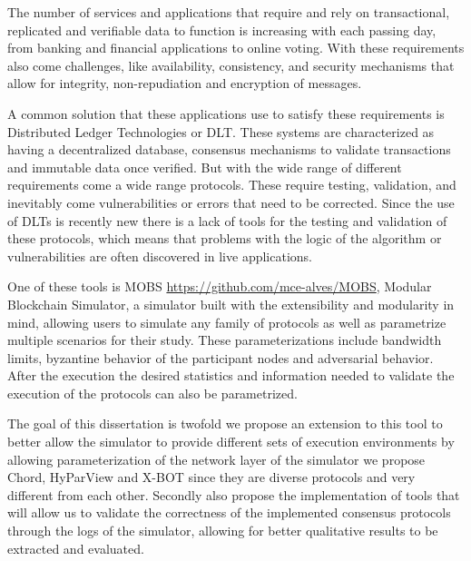 
%

The number of services and applications that require and rely on transactional, replicated and verifiable data to 
function is increasing with each passing day, from banking and financial applications to online voting. With these
requirements also come challenges, like availability, consistency, and security mechanisms that allow for integrity, non-repudiation and
encryption of messages.

A common solution that these applications use to satisfy these requirements is Distributed Ledger Technologies 
or DLT. These systems are characterized as having a decentralized database, consensus mechanisms 
to validate transactions and immutable data once verified. But with the wide range of different requirements come a wide range protocols.
These require testing, validation, and inevitably come vulnerabilities or errors that need to be corrected.
Since the use of DLTs is recently new there is a lack of tools for the testing and
validation of these protocols, which means that problems with the logic of the algorithm or vulnerabilities are often discovered in live
applications.

One of these tools is MOBS \url{https://github.com/mce-alves/MOBS}, Modular Blockchain Simulator, a simulator built with the extensibility and
modularity in mind, allowing users to simulate any family of protocols as well as parametrize multiple scenarios for their study.
These parameterizations include bandwidth limits, byzantine behavior of the participant nodes and adversarial behavior. After the execution
the desired statistics and information needed to validate the execution of the protocols can also be parametrized.

The goal of this dissertation is twofold we propose an extension to this tool to better allow the simulator to provide different sets of execution environments by
allowing parameterization of the network layer of the simulator we propose Chord, HyParView and X-BOT since they are diverse protocols and very different from each other.
Secondly also propose the implementation of tools that will allow us to validate the correctness of the implemented consensus protocols through the logs of the simulator,
allowing for better qualitative results to be extracted and evaluated.

